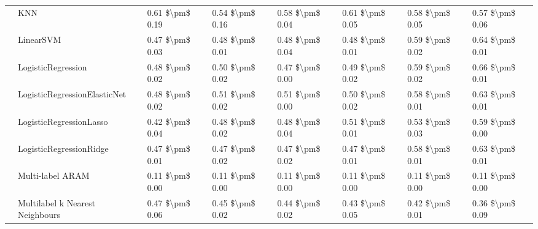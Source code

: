 \begin{tabular}{llllllll}
   & KNN &      0.61 \$\textbackslash pm\$ 0.19 &           0.54 \$\textbackslash pm\$ 0.16 &       0.58 \$\textbackslash pm\$ 0.04 &        0.61 \$\textbackslash pm\$ 0.05 &                         0.58 \$\textbackslash pm\$ 0.05 &      0.57 \$\textbackslash pm\$ 0.06 \\
   & LinearSVM &      0.47 \$\textbackslash pm\$ 0.03 &           0.48 \$\textbackslash pm\$ 0.01 &       0.48 \$\textbackslash pm\$ 0.04 &        0.48 \$\textbackslash pm\$ 0.01 &                         0.59 \$\textbackslash pm\$ 0.02 &      0.64 \$\textbackslash pm\$ 0.01 \\
   & LogisticRegression &      0.48 \$\textbackslash pm\$ 0.02 &           0.50 \$\textbackslash pm\$ 0.02 &       0.47 \$\textbackslash pm\$ 0.00 &        0.49 \$\textbackslash pm\$ 0.02 &                         0.59 \$\textbackslash pm\$ 0.02 &      0.66 \$\textbackslash pm\$ 0.01 \\
   & LogisticRegressionElasticNet &      0.48 \$\textbackslash pm\$ 0.02 &           0.51 \$\textbackslash pm\$ 0.02 &       0.51 \$\textbackslash pm\$ 0.00 &        0.50 \$\textbackslash pm\$ 0.02 &                         0.58 \$\textbackslash pm\$ 0.01 &      0.63 \$\textbackslash pm\$ 0.01 \\
   & LogisticRegressionLasso &      0.42 \$\textbackslash pm\$ 0.04 &           0.48 \$\textbackslash pm\$ 0.02 &       0.48 \$\textbackslash pm\$ 0.04 &        0.51 \$\textbackslash pm\$ 0.01 &                         0.53 \$\textbackslash pm\$ 0.03 &      0.59 \$\textbackslash pm\$ 0.00 \\
   & LogisticRegressionRidge &      0.47 \$\textbackslash pm\$ 0.01 &           0.47 \$\textbackslash pm\$ 0.02 &       0.47 \$\textbackslash pm\$ 0.02 &        0.47 \$\textbackslash pm\$ 0.01 &                         0.58 \$\textbackslash pm\$ 0.01 &      0.63 \$\textbackslash pm\$ 0.01 \\
   & Multi-label ARAM &      0.11 \$\textbackslash pm\$ 0.00 &           0.11 \$\textbackslash pm\$ 0.00 &       0.11 \$\textbackslash pm\$ 0.00 &        0.11 \$\textbackslash pm\$ 0.00 &                         0.11 \$\textbackslash pm\$ 0.00 &      0.11 \$\textbackslash pm\$ 0.00 \\
   & Multilabel k Nearest Neighbours &      0.47 \$\textbackslash pm\$ 0.06 &           0.45 \$\textbackslash pm\$ 0.02 &       0.44 \$\textbackslash pm\$ 0.02 &        0.43 \$\textbackslash pm\$ 0.05 &                         0.42 \$\textbackslash pm\$ 0.01 &      0.36 \$\textbackslash pm\$ 0.09 \\

\end{tabular}
